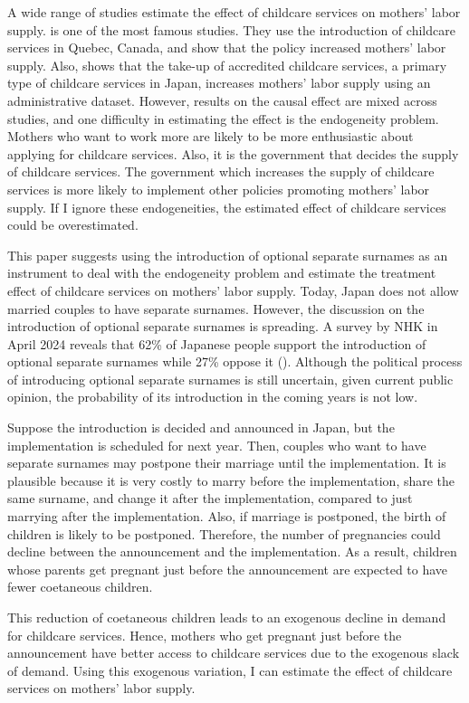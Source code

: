 \documentclass[12pt]{article}
\begin{document}
A wide range of studies estimate the effect of childcare services on mothers' labor supply.
\cite{Baker2008-vt} is one of the most famous studies. 
They use the introduction of childcare services in Quebec, Canada, and show that the policy increased mothers' labor supply.
Also, \cite{kondo2024} shows that the take-up of accredited childcare services, a primary type of childcare services in Japan, increases mothers' labor supply using an administrative dataset.
However, results on the causal effect are mixed across studies, and one difficulty in estimating the effect is the endogeneity problem.
Mothers who want to work more are likely to be more enthusiastic about applying for childcare services.
Also, it is the government that decides the supply of childcare services. 
The government which increases the supply of childcare services is more likely to implement other policies promoting mothers' labor supply.
If I ignore these endogeneities, the estimated effect of childcare services could be overestimated.


This paper suggests using the introduction of optional separate surnames as an instrument to deal with the endogeneity problem and estimate the treatment effect of childcare services on mothers' labor supply.
Today, Japan does not allow married couples to have separate surnames.
However, the discussion on the introduction of optional separate surnames is spreading.
A survey by NHK in April 2024 reveals that 62\% of Japanese people support the introduction of optional separate surnames while 27\% oppose it (\cite{nhk}).
Although the political process of introducing optional separate surnames is still uncertain, given current public opinion, the probability of its introduction in the coming years is not low.


Suppose the introduction is decided and announced in Japan, but the implementation is scheduled for next year.
Then, couples who want to have separate surnames may postpone their marriage until the implementation. 
It is plausible because it is very costly to marry before the implementation, share the same surname, and change it after the implementation, compared to just marrying after the implementation.
Also, if marriage is postponed, the birth of children is likely to be postponed.
Therefore, the number of pregnancies could decline between the announcement and the implementation.
As a result, children whose parents get pregnant just before the announcement are expected to have fewer coetaneous children.


This reduction of coetaneous children leads to an exogenous decline in demand for childcare services.
Hence, mothers who get pregnant just before the announcement have better access to childcare services due to the exogenous slack of demand.
Using this exogenous variation, I can estimate the effect of childcare services on mothers' labor supply. 
\end{document}
